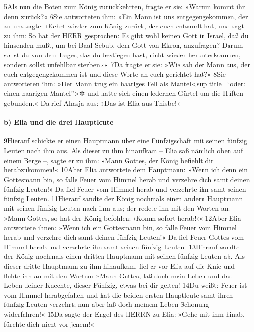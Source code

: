5Als nun die Boten zum König zurückkehrten, fragte er sie: »Warum kommt
ihr denn zurück?« 6Sie antworteten ihm: »Ein Mann ist uns
entgegengekommen, der zu uns sagte: ›Kehrt wieder zum König zurück, der
euch entsandt hat, und sagt zu ihm: So hat der HERR gesprochen: Es gibt
wohl keinen Gott in Israel, daß du hinsenden mußt, um bei Baal-Sebub,
dem Gott von Ekron, anzufragen? Darum sollst du von dem Lager, das du
bestiegen hast, nicht wieder herunterkommen, sondern sollst unfehlbar
sterben.‹« 7Da fragte er sie: »Wie sah der Mann aus, der euch
entgegengekommen ist und diese Worte an euch gerichtet hat?« 8Sie
antworteten ihm: »Der Mann trug ein haariges Fell als
Mantel\textless sup title=``oder: einen haarigen Mantel''\textgreater✲
und hatte sich einen ledernen Gürtel um die Hüften gebunden.« Da rief
Ahasja aus: »Das ist Elia aus Thisbe!«

\hypertarget{b-elia-und-die-drei-hauptleute}{%
\paragraph{b) Elia und die drei
Hauptleute}\label{b-elia-und-die-drei-hauptleute}}

9Hierauf schickte er einen Hauptmann über eine Fünfzigschaft mit seinen
fünfzig Leuten nach ihm aus. Als dieser zu ihm hinaufkam -- Elia saß
nämlich oben auf einem Berge --, sagte er zu ihm: »Mann Gottes, der
König befiehlt dir herabzukommen!« 10Aber Elia antwortete dem Hauptmann:
»Wenn ich denn ein Gottesmann bin, so falle Feuer vom Himmel herab und
verzehre dich samt deinen fünfzig Leuten!« Da fiel Feuer vom Himmel
herab und verzehrte ihn samt seinen fünfzig Leuten. 11Hierauf sandte der
König nochmals einen andern Hauptmann mit seinen fünfzig Leuten nach ihm
aus; der redete ihn mit den Worten an: »Mann Gottes, so hat der König
befohlen: ›Komm sofort herab!‹« 12Aber Elia antwortete ihnen: »Wenn ich
ein Gottesmann bin, so falle Feuer vom Himmel herab und verzehre dich
samt deinen fünfzig Leuten!« Da fiel Feuer Gottes vom Himmel herab und
verzehrte ihn samt seinen fünfzig Leuten. 13Hierauf sandte der König
nochmals einen dritten Hauptmann mit seinen fünfzig Leuten ab. Als
dieser dritte Hauptmann zu ihm hinaufkam, fiel er vor Elia auf die Knie
und flehte ihn an mit den Worten: »Mann Gottes, laß doch mein Leben und
das Leben deiner Knechte, dieser Fünfzig, etwas bei dir gelten! 14Du
weißt: Feuer ist vom Himmel herabgefallen und hat die beiden ersten
Hauptleute samt ihren fünfzig Leuten verzehrt; nun aber laß doch meinem
Leben Schonung widerfahren!« 15Da sagte der Engel des HERRN zu Elia:
»Gehe mit ihm hinab, fürchte dich nicht vor jenem!«

